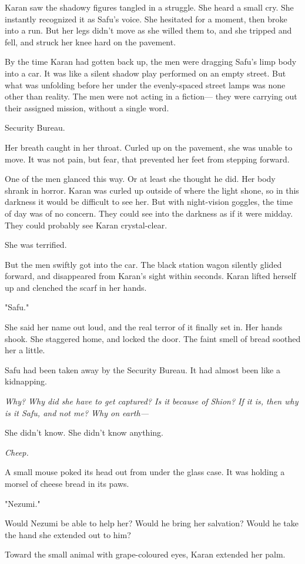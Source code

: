 Karan saw the shadowy figures tangled in a struggle. She heard a small
cry. She instantly recognized it as Safu's voice. She hesitated for a
moment, then broke into a run. But her legs didn't move as she willed
them to, and she tripped and fell, and struck her knee hard on the
pavement.

By the time Karan had gotten back up, the men were dragging Safu's limp
body into a car. It was like a silent shadow play performed on an empty
street. But what was unfolding before her under the evenly-spaced street
lamps was none other than reality. The men were not acting in a fiction---
they were carrying out their assigned mission, without a single word.

Security Bureau.

Her breath caught in her throat. Curled up on the pavement, she was
unable to move. It was not pain, but fear, that prevented her feet from
stepping forward.

One of the men glanced this way. Or at least she thought he did. Her
body shrank in horror. Karan was curled up outside of where the light
shone, so in this darkness it would be difficult to see her. But with
night-vision goggles, the time of day was of no concern. They could see
into the darkness as if it were midday. They could probably see Karan
crystal-clear.

She was terrified.

But the men swiftly got into the car. The black station wagon silently
glided forward, and disappeared from Karan's sight within seconds. Karan
lifted herself up and clenched the scarf in her hands.

"Safu."

She said her name out loud, and the real terror of it finally set in.
Her hands shook. She staggered home, and locked the door. The faint
smell of bread soothed her a little.

Safu had been taken away by the Security Bureau. It had almost been like
a kidnapping.

\emph{Why? Why did she have to get captured? Is it because of Shion? If it is,
then why is it Safu, and not me? Why on earth---}

She didn't know. She didn't know anything.

\emph{Cheep.}

A small mouse poked its head out from under the glass case. It was
holding a morsel of cheese bread in its paws.

"Nezumi."

Would Nezumi be able to help her? Would he bring her salvation? Would he
take the hand she extended out to him?

Toward the small animal with grape-coloured eyes, Karan extended her
palm.